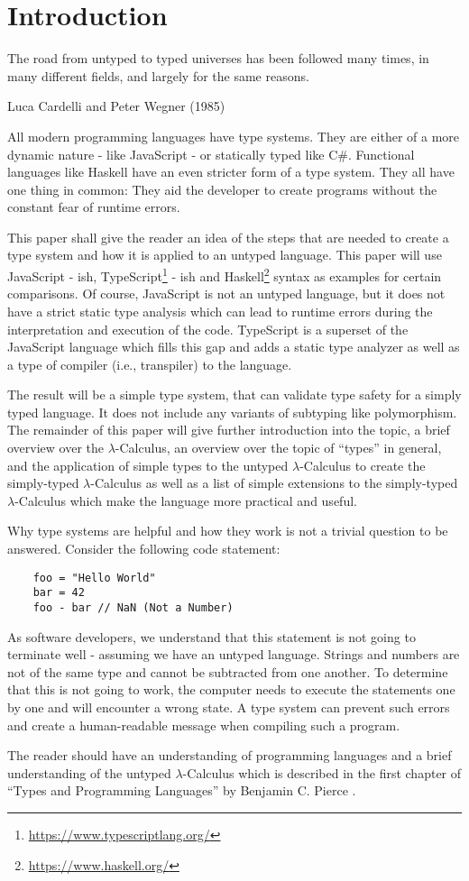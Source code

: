 \section{Introduction}

\epigraph{
    The road from untyped to typed universes has been followed many times,
    in many different fields, and largely for the same reasons.
}
{Luca Cardelli and Peter Wegner (1985)}

All modern programming languages have type systems.
They are either of a more dynamic nature - like JavaScript -
or statically typed like C\#. Functional languages like Haskell have
an even stricter form of a type system. They all have one thing in
common: They aid the developer to create programs without 
the constant fear of runtime errors.

This paper shall give the reader an idea of the steps that
are needed to create a type system and how it is applied to
an untyped language. This paper will use JavaScript - ish,
TypeScript\footnote{\url{https://www.typescriptlang.org/}} - ish
and Haskell\footnote{\url{https://www.haskell.org/}}
syntax as examples for certain comparisons.
Of course, JavaScript is not an untyped language, but
it does not have a strict static type analysis which can lead
to runtime errors during the interpretation and execution of the code.
TypeScript is a superset of the JavaScript language which fills this
gap and adds a static type analyzer as well as a type of compiler
(i.e., transpiler) to the language.

The result will be a simple type system, that can validate
type safety for a simply typed language. It does not include
any variants of subtyping like polymorphism. The remainder
of this paper will give further introduction into the topic,
a brief overview over the $\lambda$-Calculus, an overview
over the topic of ``types'' in general, and the application
of simple types to the untyped $\lambda$-Calculus to create the
simply-typed $\lambda$-Calculus as well as a list of simple
extensions to the simply-typed $\lambda$-Calculus which make
the language more practical and useful.

Why type systems are helpful and how they work
is not a trivial question to be answered. Consider
the following code statement:

\begin{verbatim}
    foo = "Hello World"
    bar = 42
    foo - bar // NaN (Not a Number)
\end{verbatim}

As software developers, we understand that this statement
is not going to terminate well - assuming we have an untyped
language. Strings and numbers are not
of the same type and cannot be subtracted from one another. To determine
that this is not going to work, the computer needs to execute
the statements one by one and will encounter a wrong state.
A type system can prevent such errors and create a
human-readable message when compiling such a program.

The reader should have an understanding of programming
languages and a brief understanding of the untyped
$\lambda$-Calculus which is described in the first
chapter of ``Types and Programming Languages'' by
Benjamin C. Pierce \cite{pierce2002ProgLang}.
